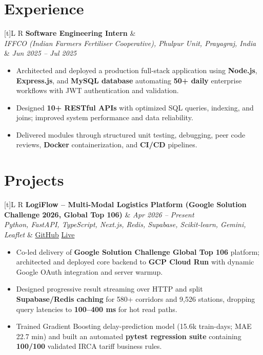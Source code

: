 \documentclass[a4paper,10pt]{article}
\newcommand{\resumeSubheading}[4]{
  \vspace{0.5mm}
  \noindent
  \begin{tabularx}{\textwidth}[t]{L R}
    \textbf{#1} & #4 \\
    \textit{#3} & \textit{#2} \\
  \end{tabularx}
  \vspace{-0.5mm}
}
\newcommand{\resumeProject}[4]{
  \vspace{0.5mm}
  \noindent
  \begin{tabularx}{\textwidth}[t]{L R}
    \textbf{#1} & \textit{#3} \\
    \textit{#2} & #4 \\
  \end{tabularx}
  \vspace{-0.5mm}
}
\begin{document}
\section{Experience}
\small
\resumeSubheading
  {Software Engineering Intern}{Jun 2025 -- Jul 2025}
  {IFFCO (Indian Farmers Fertiliser Cooperative), Phulpur Unit, Prayagraj, India}{}
\begin{itemize}
  \item Architected and deployed a production full-stack application using \textbf{Node.js}, \textbf{Express.js}, and \textbf{MySQL database} automating \textbf{50+ daily} enterprise workflows with JWT authentication and validation.
  \item Designed \textbf{10+ RESTful APIs} with optimized SQL queries, indexing, and joins; improved system performance and data reliability.
  \item Delivered modules through structured unit testing, debugging, peer code reviews, \textbf{Docker} containerization, and \textbf{CI/CD} pipelines.
\end{itemize}

\section{Projects}
\small

\resumeProject
  {LogiFlow -- Multi-Modal Logistics Platform (Google Solution Challenge 2026, Global Top 106)}
  {Python, FastAPI, TypeScript, Next.js, Redis, Supabase, Scikit-learn, Gemini, Leaflet}
  {Apr 2026 -- Present}
  {\href{https://github.com/Ojas-Srivastava05/LogiFlow-Solution-Challenge-2026}{GitHub} \textbar{} \href{https://logi-flow-solution-challenge-2026.vercel.app/}{Live}}
\begin{itemize}
  \item Co-led delivery of \textbf{Google Solution Challenge Global Top 106} platform; architected and deployed core backend to \textbf{GCP Cloud Run} with dynamic Google OAuth integration and server warmup.
  \item Designed progressive result streaming over HTTP and split \textbf{Supabase/Redis caching} for 580+ corridors and 9,526 stations, dropping query latencies to \textbf{100--400 ms} for hot read paths.
  \item Trained Gradient Boosting delay-prediction model (15.6k train-days; MAE 22.7 min) and built an automated \textbf{pytest regression suite} containing \textbf{100/100} validated IRCA tariff business rules.
\end{itemize}
\end{document}
